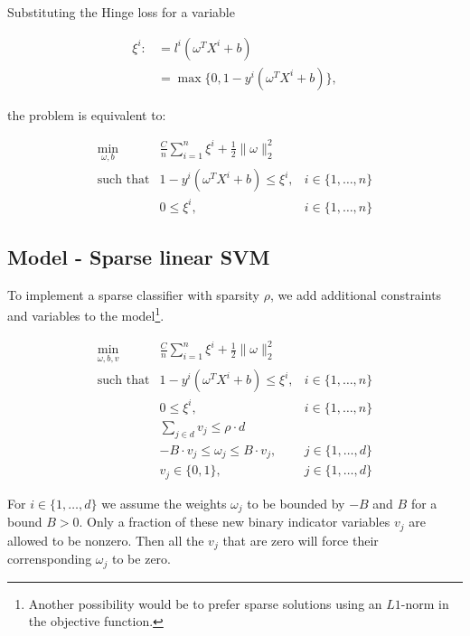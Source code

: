 \documentclass[11pt]{article}
\begin{document}
Substituting the Hinge loss for a variable

$$ \begin{aligned}
\xi^i :&= l^i( \omega^T X^i + b ) \\
&= \max \{0, 1 - y^i (\omega^TX^i + b) \},
\end{aligned} $$

the problem is equivalent to:

\begin{equation*}
\begin{array}{rll}
  \min\limits_{\omega, b}
  & \frac{C}{n} \sum\limits_{i = 1}^n \xi^i + \frac{1}{2} \lVert \omega \rVert_2^2
\\
  \text{such that}
  & 1 - y^i (\omega^T X^i +b) \leq \xi^i,
  & i \in \{1,\dots,n\}
\\
  & 0 \leq \xi^i,
  & i \in \{1,\dots, n\}
\end{array}
\end{equation*}

\clearpage
\subsection*{Model - Sparse linear SVM}

To implement a sparse classifier with sparsity $\rho$, we add additional constraints and variables to the model\footnote{
  Another possibility would be to prefer sparse solutions using an $L1$-norm in the objective function.}.

\begin{equation*}
\begin{array}{rll}
  \min\limits_{\omega, b, v}
  & \frac{C}{n} \sum\limits_{i = 1}^{n} \xi^{i} + \frac{1}{2} \lVert \omega \rVert_{2}^{2}
  &
\\
  \text{such that}
  & 1 - y^i (\omega^T X^i +b) \leq \xi^i,
  & i \in \{1,\dots,n\}
\\
  & 0 \leq \xi^i,
  & i \in \{1, \dots, n\}
\\
  & \sum_{j \in d} v_{j} \leq \rho \cdot d
  &
\\
  & -B \cdot v_{j} \leq \omega_{j} \leq B \cdot v_{j},
  & j \in \{ 1, \dots, d \}
\\
  & v_{j} \in \{0,1\},
  & j \in \{1,\dots, d\}
\end{array}
\end{equation*}

For $i \in \{ 1, \dots, d \}$ we assume the weights $\omega_j$ to be bounded by $-B$ and $B$ for a bound $B > 0$.
Only a fraction of these new binary indicator variables $v_j$ are allowed to be nonzero.
Then all the $v_j$ that are zero will force their corrensponding $\omega_j$ to be zero.
\end{document}
